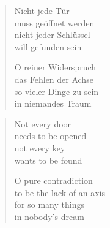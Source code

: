 
\cleartoverso


\begin{verse}

Nicht jede Tür\\
muss geöffnet werden\\
nicht jeder Schlüssel\\
will gefunden sein

O reiner Widerspruch\\
das Fehlen der Achse\\
so vieler Dinge zu sein\\
in niemandes Traum

\end{verse}

\clearpage

\label{hall-of-mirrors}

\begin{verse}

Not every door\\
needs to be opened\\
not every key\\
wants to be found

O pure contradiction\\
to be the lack of an axis\\
for so many things\\
in nobody's dream

\end{verse}
